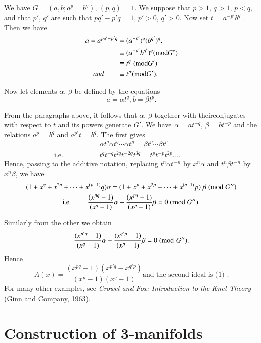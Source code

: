 We have $G = (a, b; a^p = b^q)$, $(p,q) =1$. We suppose that $p > 1$,
$q> 1$, $p < q$, and that $p'$, $q'$ are such that $pq' - p' q = 1$,
$p' > 0$, $q' > 0$. Now set $t = a^{-p'} b^{q'}$. Then we have  
\begin{align*}
a = a^{pq' - p' q} & = (a^{-p'})^q (b^{q'})^q.\\
& \equiv (a^{-p'}b^{q'})^q  ({\rm mod}   G')\\
& \equiv t^q ~({\rm mod}   G')\\
and \qquad & \equiv t^p   ({\rm mod}   G'). 
\end{align*}

Now let elements $\alpha$, $\beta$ be defined by the equations
$$
a = \alpha t^q, b= \beta t^p. 
$$

From the paragraphs above, it follows that $\alpha$, $\beta$ together
with their\pageoriginale conjugates with respect to $t$ and its powers
generate $G'$. We have $\alpha = at^{-q}$, $\beta = bt^{-p}$ and the
relations $a^p = b^q$ and $a^{p'} t = b^q$. The first gives  
\begin{align*}
 & \alpha t^q \alpha t^q \cdots \alpha t^q = \beta t^p \cdots \beta t^p \\
\text{i.e. }  \qquad \qquad  & t^q t^{-q} t^{2q} t^{-2q} t^{3q}  = t^p
t^{-p} t^{2p}\ldots. \qquad \qquad  
\end{align*}
Hence, passing to the additive notation, replacing $t^n \alpha t^{-n}$
by $x^n \alpha$ and $t^n \beta t^{-n}$ by $x^n \beta$, we have 
{\fontsize{10pt}{12pt}\selectfont
\begin{gather*}
(1 + x^q+x^{2q}+ \cdots + x^{(p-1)}q) \alpha = (1 + x^p+
  x^{2p}+ \cdots + x^{(q-1)}p) \; \beta \; ({\rm mod} \; G'') \\
\text{i.e. } \qquad 
\frac{(x^{pq}-1)}{(x^q -1)} \alpha - \frac{(x^{pq}-1)}{(x^p -1)} \beta
=0 \; ({\rm mod} \; G''). 
\end{gather*}}\relax


Similarly from the other we obtain
$$
\frac{(x^{p' q}-1)}{(x^q -1)} \alpha - \frac{(x^{q'p} -1)}{(x^p -1)} 
\beta =0 \; ({\rm mod} \;  G'').  
$$
Hence 
$$
A(x) = \frac{(x^{pq} -1) (x^{p'q} -x^{q'p})}{(x^p -1)(x^q -1)} \text{
  and the second ideal is (1) }. 
$$
For many other examples, see \textit{Crowel and Fox: Introduction to
  the Knet Theory} (Ginn and Company, 1963). 


\section{Construction of 3-manifolds}\label{sec8}%

